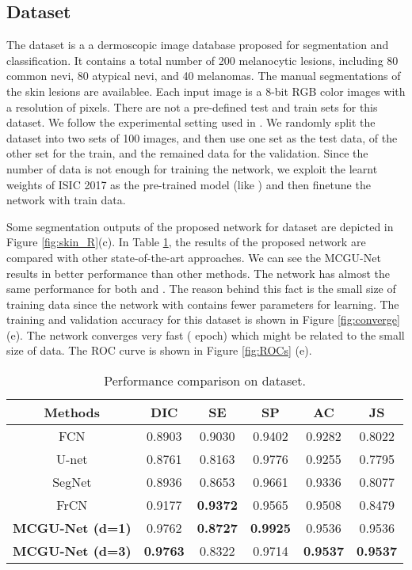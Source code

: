 \documentclass[journal]{IEEEtran}
\begin{document}
\subsection{ Dataset}
The  dataset \cite{mendoncca2013ph} is a a dermoscopic image database proposed for segmentation and classification. It contains a total number of 200 melanocytic lesions, including 80 common nevi, 80 atypical nevi, and 40 melanomas. The manual segmentations of the skin lesions are availablee. Each input image is a 8-bit RGB color images with a resolution of  pixels. There are not a pre-defined test and train sets for this dataset. We follow the experimental setting used in \cite{liu2019enhanced}. We randomly split the dataset into two sets of 100 images, and then use one set as the test data,  of the other set for the train, and the remained data for the validation. Since the number of data is not enough for training the network, we exploit the learnt weights of ISIC 2017 as the pre-trained model (like \cite{liu2019enhanced}) and then finetune the network with train data. 

Some segmentation outputs of the proposed network for  dataset are depicted in Figure \ref{fig:skin_R}(c). In Table \ref{tab:ph}, the results of the proposed network are compared with other state-of-the-art approaches. We can see the MCGU-Net results in better performance than other methods. The network has almost the same performance for both  and . The reason behind this fact is the small size of training data since the network with  contains fewer parameters for learning. The training and validation accuracy for this dataset is shown in Figure \ref{fig:converge} (e). The network converges very fast ( epoch) which might be related to the small size of data. The ROC curve is shown in Figure \ref{fig:ROCs} (e).







 \begin{table}
\centering
    \vspace*{-\baselineskip}
\caption{Performance comparison on  dataset.}
	\begin{tabular}{cccccc}
		\hline
		\textbf{Methods} & \textbf{DIC}&	\textbf{SE}&	\textbf{SP}&	\textbf{AC}&	\textbf{JS}\\
		\hline
		FCN \cite{noh2015learning} &  0.8903 & 0.9030 & 0.9402  & 0.9282 & 0.8022  \\
		U-net  \cite{ronneberger2015} & 0.8761  & 0.8163 & 0.9776 &	0.9255 &	0.7795 \\
		SegNet \cite{badrinarayanan2017segnet} & 0.8936 &	 0.8653 &	0.9661&	0.9336 &	0.8077  \\
	    FrCN \cite{al2018skin} & 0.9177&	\textbf{0.9372}   &	0.9565&	0.9508 &	0.8479 \\
		\hline
\textbf{MCGU-Net (d=1)}& 0.9762  &  \textbf{0.8727} & \textbf{0.9925} &	 0.9536 & 0.9536 \\
		\textbf{MCGU-Net (d=3)}& \textbf{0.9763 } & 0.8322 & 0.9714 & \textbf{ 0.9537}& \textbf{0.9537 }\\
		\hline
	\end{tabular}
	\label{tab:ph}
\end{table}
\end{document}

